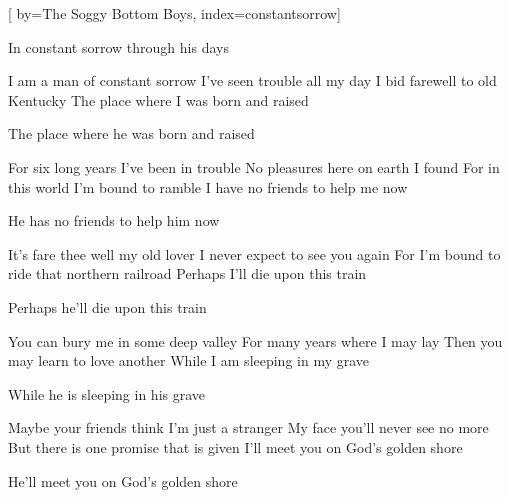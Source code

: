 
[%
    by={The Soggy Bottom Boys},
    index={constantsorrow}]


    \label{constantsorrow}

    \beginchorus
        In constant sorrow through his days
    \endchorus

    \beginverse
        I am a man of constant sorrow
        I've seen trouble all my day
        I bid farewell to old Kentucky
        The place where I was born and raised
    \endverse

    \beginchorus
        The place where he was born and raised
    \endchorus

    \beginverse
        For six long years I've been in trouble
        No pleasures here on earth I found
        For in this world I'm bound to ramble
        I have no friends to help me now
    \endverse

    \beginchorus
        He has no friends to help him now
    \endchorus

    \beginverse
        It's fare thee well my old lover
        I never expect to see you again
        For I'm bound to ride that northern railroad
        Perhaps I'll die upon this train
    \endverse

    \beginchorus
        Perhaps he'll die upon this train
    \endchorus

    \beginverse
        You can bury me in some deep valley
        For many years where I may lay
        Then you may learn to love another
        While I am sleeping in my grave
    \endverse

    \beginchorus
        While he is sleeping in his grave
    \endchorus

    \beginverse
        Maybe your friends think I'm just a stranger
        My face you'll never see no more
        But there is one promise that is given
        I'll meet you on God's golden shore
    \endverse

    \beginchorus
        He'll meet you on God's golden shore
    \endchorus
\endsong
